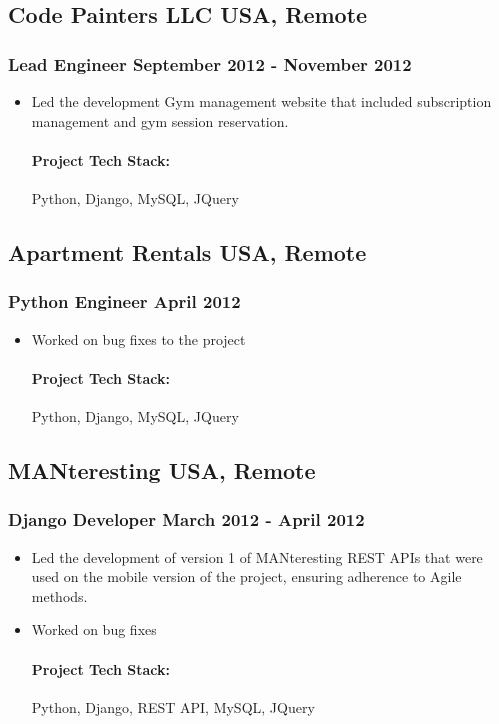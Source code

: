 \documentclass[11pt]{article} %
\begin{document}
\subsection{Code Painters LLC \hfill USA, Remote}
\subsubsection{Lead Engineer \hfill  September 2012 - November 2012}
\begin{itemize}
    \item Led the development Gym management website that included subscription management and gym session reservation.

    \paragraph{Project Tech Stack:} Python, Django, MySQL, JQuery
\end{itemize}

\subsection{Apartment Rentals \hfill USA, Remote}
\subsubsection{Python Engineer \hfill  April 2012}
\begin{itemize}
    \item Worked on bug fixes to the project
    \paragraph{Project Tech Stack:} Python, Django, MySQL, JQuery
\end{itemize}

\subsection{MANteresting \hfill USA, Remote}
\subsubsection{Django Developer \hfill  March 2012 - April 2012}
\begin{itemize}
    \item Led the development of version 1 of MANteresting REST APIs that were used on the mobile version of the project, ensuring adherence to Agile methods.
    \item Worked on bug fixes
    \paragraph{Project Tech Stack:} Python, Django, REST API, MySQL, JQuery
\end{itemize}
\end{document}
